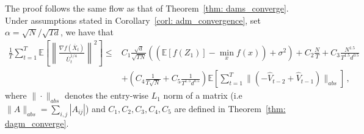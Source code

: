 \documentclass[11pt]{article}
\begin{document}
The proof follows the same flow as that of Theorem~\ref{thm: dams_converge}. Under assumptions stated in Corollary~\ref{corl: adm_convergence}, set $\alpha = \sqrt{N}/\sqrt{Td}$, we have that
\begin{align}\label{eq: rep_thm1bis}
	 \frac{1}{T}\sum_{t=1}^T  \mathbb E \left [\left\|\frac{\nabla f( \overline X_{t})}{\overline U_{t}^{1/4}}\right\|^2  \right] 
	\leq  & C_1 \frac{\sqrt{d}}{\sqrt{TN}} \left(( \mathbb E  [f( Z_{1})]  -  \min_x  f(x)) +    \sigma^2 \right)  +  C_2 \frac{N}{T}  +  C_3 \frac{N^{1.5}}{T^{1.5}d^{0.5}} 
	\nonumber \\
    &+  \left(C_4 \frac{1}{T\sqrt{N}} +  C_5   \frac{1}{T^{1.5}d^{0.5}}\right) 
\mathbb E \left[ \sum_{t=1}^{T}   \|    (- \hat V_{t-2} + \hat V_{t-1} ) \|_{abs} \right]  \, ,
\end{align}
where $\| \cdot\|_{abs}$  denotes the entry-wise $L_1$ norm of a matrix (i.e $\| A\|_{abs} = \sum_{i,j}{|A_{ij}|}$) and $C_1, C_2 ,C_3, C_4, C_5$ are defined in Theorem~\ref{thm: dagm_converge}. 
\end{document}
